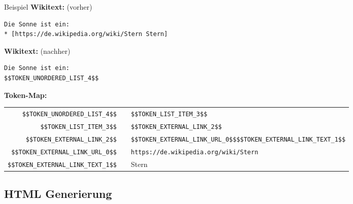 \documentclass[9pt]{beamer}
\begin{document}
	\begin{frame}[fragile]{Beispiel}
		\textbf{Wikitext:} (vorher)\\
		\begin{verbatim}
Die Sonne ist ein:
* [https://de.wikipedia.org/wiki/Stern Stern]
		\end{verbatim}\n\pause
		\textbf{Wikitext:} (nachher)\\
		\begin{verbatim}
Die Sonne ist ein:
$$TOKEN_UNORDERED_LIST_4$$
		\end{verbatim}\n\pause
		\textbf{Token-Map:}\n
		\hspace{-0.65cm}
		\addtolength{\tabcolsep}{-0.5\tabcolsep}
		\begin{tabularx}{\textwidth}{rcp{6cm}}
			\verb+$$TOKEN_UNORDERED_LIST_4$$+		& \textrightarrow & \verb+$$TOKEN_LIST_ITEM_3$$+\\
			\verb+$$TOKEN_LIST_ITEM_3$$+			& \textrightarrow & \verb+$$TOKEN_EXTERNAL_LINK_2$$+\\
			\verb+$$TOKEN_EXTERNAL_LINK_2$$+		& \textrightarrow & \verb+$$TOKEN_EXTERNAL_LINK_URL_0$$+\newline\verb+$$TOKEN_EXTERNAL_LINK_TEXT_1$$+\\
			\verb+$$TOKEN_EXTERNAL_LINK_URL_0$$+	& \textrightarrow & \verb+https://de.wikipedia.org/wiki/Stern+\\
			\verb+$$TOKEN_EXTERNAL_LINK_TEXT_1$$+	& \textrightarrow & Stern\\
		\end{tabularx}
	\end{frame}

	\subsection{HTML Generierung}
\end{document}
